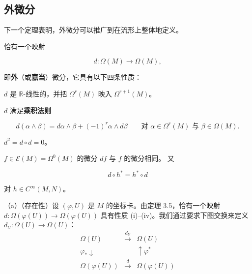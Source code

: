 \subsection*{外微分}

下一个定理表明，外微分可以推广到在流形上整体地定义。

\begin{theorem}

恰有一个映射

\[
d: \Omega(M) \to \Omega(M) ,
\]

即\textbf{外}（或\textbf{嘉当}）微分，它具有以下四条性质：

\begin{subitems}
\item

$ d $ 是 $ \mathbb{R} $-线性的，并把 $ \Omega^{r}(M) $ 映入 $ \Omega^{r+1}(M) $。

\item

$ d $ 满足\textbf{乘积法则}

\[
d(\alpha\wedge\beta) = d\alpha\wedge\beta + (-1)^{r}\alpha\wedge d\beta \qquad \text{对 } \alpha\in\Omega^{r}(M) \text{ 与 } \beta\in\Omega(M) .
\]
\item

$ d^{2} = d\circ d = 0 $。

\item

$ f\in\mathcal{E}(M) = \Omega^{0}(M) $ 的微分 $ df $ 与 $ f $ 的微分相同。
又

\begin{equation}
d\circ h^{\ast} = h^{\ast}\circ d\tag{4.18}
\end{equation}

对 $ h\in C^{\infty}(M,N) $。

\proofhead
（a）（存在性）设 $ (\varphi, U) $ 是 $ M $ 的坐标卡。由定理 3.5，恰有一个映射 $ d: \Omega(\varphi(U))\to\Omega(\varphi(U)) $ 具有性质 (i)–(iv)。我们通过要求下图交换来定义 $ d_{U}: \Omega(U)\to\Omega(U) $：
\begin{equation}
\begin{array}{ccc} \Omega(U) & \xrightarrow{d_{U}} & \Omega(U) \\ \varphi_{\ast}\downarrow & & \uparrow\varphi^{\ast} \\ \Omega(\varphi(U)) & \xrightarrow{d} & \Omega(\varphi(U)) \end{array}\tag{4.19}
\end{equation}


\end{subitems}
\end{theorem}

